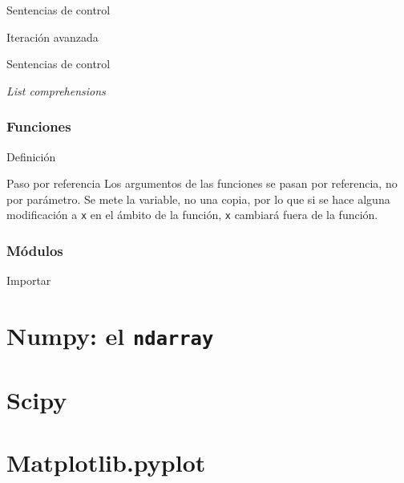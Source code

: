 \documentclass{beamer}
\begin{document}
\begin{frame}{Sentencias de control}
	\begin{block}{Iteración avanzada}
		
	\end{block}
\end{frame}

\begin{frame}{Sentencias de control}
	\begin{block}{\textsl{List comprehensions}}
		
	\end{block}
\end{frame}

\begin{frame}\frametitle{Funciones}
	\begin{block}{Definición}
		
	\end{block}
	\begin{alertblock}{Paso por referencia}
		Los argumentos de las funciones se pasan por referencia, no por parámetro. Se mete la variable, no una copia, por lo que si se hace alguna modificación a \texttt{x} en el ámbito de la función, \texttt{x} cambiará fuera de la función.
	\end{alertblock}
\end{frame}

\begin{frame}\frametitle{Módulos}
	\begin{block}{Importar}
		
	\end{block}
\end{frame}

\section{Numpy: el \texttt{ndarray}}

\section{Scipy}

\section{Matplotlib.pyplot}
\end{document}
